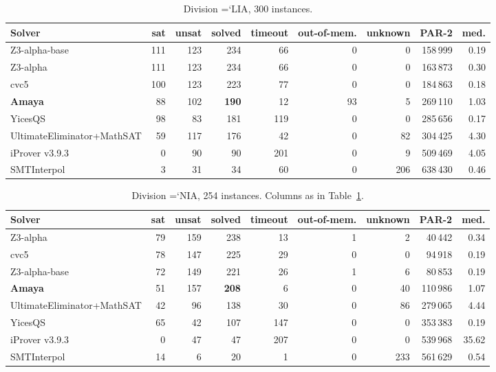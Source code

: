 \documentclass[10pt,a4paper]{article}
\newcommand{\code}[1]{{\small\ttfamily\hyphenchar\font=`\-\relax #1}}
\begin{document}
\begin{table}[h]
\centering
\footnotesize
\caption{Division \code{LIA}, 300 instances.}
\label{tab:lia}
\begin{tabular}{lrrrrrrrr}
\toprule
Solver & sat & unsat & solved & timeout & out-of-mem. & unknown & PAR-2 & med. \\
\midrule
Z3-alpha-base & 111 & 123 & 234 & 66 & 0 & 0 & 158\,999 & 0.19 \\
Z3-alpha & 111 & 123 & 234 & 66 & 0 & 0 & 163\,873 & 0.30 \\
cvc5 & 100 & 123 & 223 & 77 & 0 & 0 & 184\,863 & 0.18 \\
\textbf{Amaya} & 88 & 102 & \textbf{190} & 12 & 93 & 5 & 269\,110 & 1.03 \\
YicesQS & 98 & 83 & 181 & 119 & 0 & 0 & 285\,656 & 0.17 \\
UltimateEliminator+MathSAT & 59 & 117 & 176 & 42 & 0 & 82 & 304\,425 & 4.30 \\
iProver v3.9.3 & 0 & 90 & 90 & 201 & 0 & 9 & 509\,469 & 4.05 \\
SMTInterpol & 3 & 31 & 34 & 60 & 0 & 206 & 638\,430 & 0.46 \\
\bottomrule
\end{tabular}
\end{table}

\begin{table}[h]
\centering
\footnotesize
\caption{Division \code{NIA}, 254 instances.  Columns as in Table~\ref{tab:lia}.}
\label{tab:nia}
\begin{tabular}{lrrrrrrrr}
\toprule
Solver & sat & unsat & solved & timeout & out-of-mem. & unknown & PAR-2 & med. \\
\midrule
Z3-alpha & 79 & 159 & 238 & 13 & 1 & 2 & 40\,442 & 0.34 \\
cvc5 & 78 & 147 & 225 & 29 & 0 & 0 & 94\,918 & 0.19 \\
Z3-alpha-base & 72 & 149 & 221 & 26 & 1 & 6 & 80\,853 & 0.19 \\
\textbf{Amaya} & 51 & 157 & \textbf{208} & 6 & 0 & 40 & 110\,986 & 1.07 \\
UltimateEliminator+MathSAT & 42 & 96 & 138 & 30 & 0 & 86 & 279\,065 & 4.44 \\
YicesQS & 65 & 42 & 107 & 147 & 0 & 0 & 353\,383 & 0.19 \\
iProver v3.9.3 & 0 & 47 & 47 & 207 & 0 & 0 & 539\,968 & 35.62 \\
SMTInterpol & 14 & 6 & 20 & 1 & 0 & 233 & 561\,629 & 0.54 \\
\bottomrule
\end{tabular}
\end{table}
\end{document}
